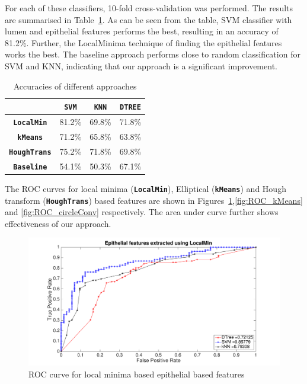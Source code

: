 For each of these classifiers, 10-fold cross-validation was performed. The results are summarised in Table~\ref{table:accuracy}. As can be seen from the table, SVM classifier with lumen and epithelial features performs the best, resulting in an accuracy of 81.2\%. Further, the LocalMinima technique of finding the epithelial features works the best. The baseline approach performs close to random classification for SVM and KNN, indicating that our approach is a significant improvement.

\begin{table}
\centering
\begin{tabular}{|c|c|c|c| }
\hline
 & \textbf{\texttt{SVM}} & \textbf{\texttt{KNN}} & \textbf{\texttt{DTREE}} \\ \hline
\textbf{\texttt{LocalMin}} & 81.2\% & 69.8\% & 71.8\% \\ \hline
\textbf{\texttt{kMeans}} & 71.2\%  & 65.8\% & 63.8\% \\ \hline
\textbf{ \texttt{HoughTrans}} & 75.2\% & 71.8\% & 69.8\% \\ \hline
\textbf{ \texttt{Baseline}} & 54.1\% & 50.3\% & 67.1\% \\ \hline
\end{tabular}
\caption{\label{table:accuracy}Accuracies of different approaches}
\end{table}

The ROC curves for local minima (\textbf{\texttt{LocalMin}}), Elliptical (\textbf{\texttt{kMeans}}) and Hough transform (\textbf{\texttt{HoughTrans}}) based features are shown in Figures~\ref{fig:ROC_localMin},\ref{fig:ROC_kMeans} and \ref{fig:ROC_circleConv} respectively. The area under curve further shows effectiveness of our approach. 

\begin{figure}[!htb]
\includegraphics[scale=0.2]{figs/ROC_localMin.pdf}
\caption{\label{fig:ROC_localMin}ROC curve for local minima based epithelial based features}
\end{figure}  


